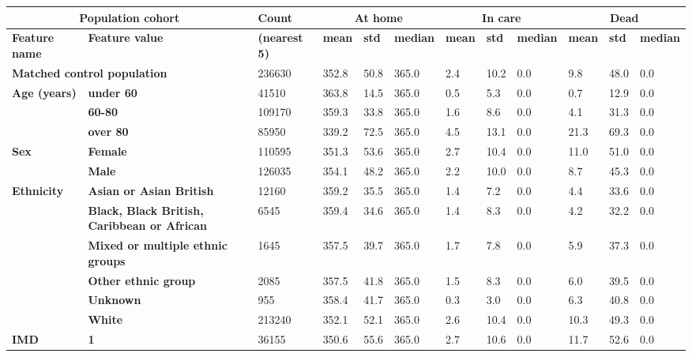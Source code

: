 \begin{landscape}
\newpage
\begin{table}[!ht]
    \small
    \centering
    \begin{tabular}{|l|l|l|l|l|l|l|l|l|l|l|l|}
    \hline
        \multicolumn{2}{|c|}{\bf Population cohort} & \bf Count & \multicolumn{3}{|c|}{\bf At home} & \multicolumn{3}{|c|}{\bf In care} & \multicolumn{3}{|c|}{\bf Dead}\\ \hline
        \bf Feature name & \bf Feature value & \bf (nearest 5) & \bf mean & \bf std & \bf median & \bf mean & \bf std & \bf median & \bf mean & \bf std & \bf median \\ \hline
        \multicolumn{2}{|l|}{\bf Matched control population} & 236630 & 352.8 & 50.8 & 365.0 & 2.4 & 10.2 & 0.0 & 9.8 & 48.0 & 0.0 \\ \hline
        \multirow{3}{*}{\bf Age (years)} & \bf under 60 &  41510 & 363.8 & 14.5 & 365.0 & 0.5 & 5.3 & 0.0 & 0.7 & 12.9 & 0.0 \\
        & \bf 60-80 & 109170 & 359.3 & 33.8 & 365.0 & 1.6 & 8.6 & 0.0 & 4.1 & 31.3 & 0.0 \\
        & \bf over 80 & 85950 & 339.2 & 72.5 & 365.0 & 4.5 & 13.1 & 0.0 & 21.3 & 69.3 & 0.0 \\ \hline
        \multirow{2}{*}{\bf Sex} & \bf Female & 110595 & 351.3 & 53.6 & 365.0 & 2.7 & 10.4 & 0.0 & 11.0 & 51.0 & 0.0 \\
        & \bf Male & 126035 & 354.1 & 48.2 & 365.0 & 2.2 & 10.0 & 0.0 & 8.7 & 45.3 & 0.0 \\ \hline
        \multirow{6}{*}{\bf Ethnicity} & \bf Asian or Asian British & 12160 & 359.2 & 35.5 & 365.0 & 1.4 & 7.2 & 0.0 & 4.4 & 33.6 & 0.0 \\
        & \bf Black, Black British, Caribbean or African & 6545 & 359.4 & 34.6 & 365.0 & 1.4 & 8.3 & 0.0 & 4.2 & 32.2 & 0.0 \\
        & \bf Mixed or multiple ethnic groups & 1645 & 357.5 & 39.7 & 365.0 & 1.7 & 7.8 & 0.0 & 5.9 & 37.3 & 0.0 \\
        & \bf Other ethnic group & 2085 & 357.5 & 41.8 & 365.0 & 1.5 & 8.3 & 0.0 & 6.0 & 39.5 & 0.0 \\
        & \bf Unknown & 955 & 358.4 & 41.7 & 365.0 & 0.3 & 3.0 & 0.0 & 6.3 & 40.8 & 0.0 \\
        & \bf White & 213240 & 352.1 & 52.1 & 365.0 & 2.6 & 10.4 & 0.0 & 10.3 & 49.3 & 0.0 \\ \hline
        \multirow{5}{*}{\bf IMD} & \bf 1 & 36155 & 350.6 & 55.6 & 365.0 & 2.7 & 10.6 & 0.0 & 11.7 & 52.6 & 0.0 \\

\end{tabular}
\end{table}
\end{landscape}
